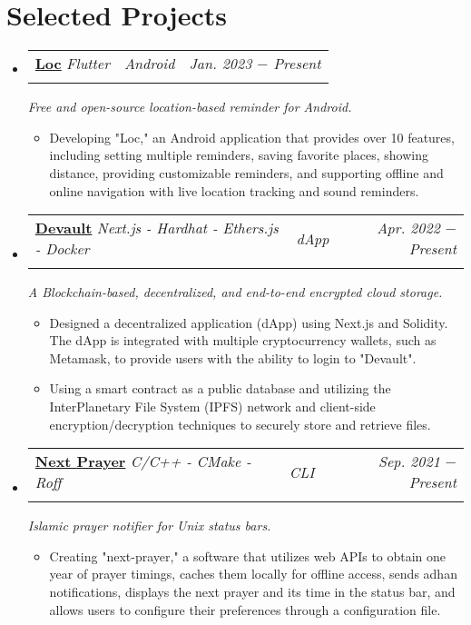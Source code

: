 \documentclass[letterpaper, 11pt]{article}
\makeatletter
\newcommand{\project}[7] {
	\vspace{-1pt}\item[]
  \begin{tabular*}{1\textwidth}[t]{ll@{\extracolsep{\fill}}r}
    #1 \href{#4}{\textbf{\color{RoyalBlue}#2}}
    \textbar{} \textit{\small#5} \textbar{ } & \textit{\footnotesize#7} & \textit{\small #3} \\
    \vspace{-8pt}
  \end{tabular*}
  \textit{\small #6}
  \vspace{-8pt}
}
\newcommand{\subproject}[1] {
\item\small
  {#1}
  \vspace{-2pt}
}
\makeatother
\begin{document}
\section{Selected Projects}
\begin{itemize}[leftmargin=0pt]
  \project
  {\faIcon{bell}}
  {Loc}{Jan. 2023 $-$ Present}
  {https://github.com/AbdeltwabMF/loc/releases/latest}{Flutter}
  {Free and open-source location-based reminder for Android.}{Android}

  \begin{itemize}
    \subproject
    {Developing "Loc," an Android application that provides over 10 features, including setting multiple reminders, saving favorite places, showing distance, providing customizable reminders, and supporting offline and online navigation with live location tracking and sound reminders.}
  \end{itemize}\vspace{-4pt}

  \project
  {\faIcon{cloud}}
  {Devault}{Apr. 2022 $-$ Present}
  {https://devault.vercel.app/}{Next.js - Hardhat - Ethers.js - Docker}
  {A Blockchain-based, decentralized, and end-to-end encrypted cloud storage.}{dApp}

  \begin{itemize}
    \subproject
    {Designed a decentralized application (dApp) using Next.js and Solidity. The dApp is integrated with multiple cryptocurrency wallets, such as Metamask, to provide users with the ability to login to "Devault".}
    \subproject
    {Using a smart contract as a public database and utilizing the InterPlanetary File System (IPFS) network and client-side encryption/decryption techniques to securely store and retrieve files.}
  \end{itemize}\vspace{-4pt}

  \project
  {\faIcon{mosque}}
  {Next Prayer}{Sep. 2021 $-$ Present}
  {https://github.com/AbdeltwabMF/next-prayer}{C/C++ - CMake - Roff}
  {Islamic prayer notifier for Unix status bars.}{CLI}

  \begin{itemize}
    \subproject
    {Creating "next-prayer," a software that utilizes web APIs to obtain one year of prayer timings, caches them locally for offline access, sends adhan notifications, displays the next prayer and its time in the status bar, and allows users to configure their preferences through a configuration file.}
  \end{itemize}\vspace{-4pt}


\end{itemize}
\end{document}
